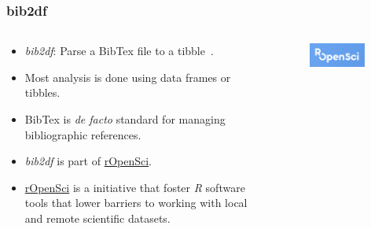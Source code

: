 \documentclass[aspectratio=169]{beamer}
\begin{document}
\begin{frame}
    \frametitle{bib2df}
    \begin{columns}
        \begin{column}{0.5\textwidth}
            \begin{itemize}
                \item \textit{bib2df}: Parse a BibTex file to a 
                    tibble~\cite{ottolinger2024}.
                \item Most  analysis is done using data frames or 
                    tibbles.
                \item BibTex is \textit{de facto} standard for managing 
                    bibliographic references.
                \item \textit{bib2df} is part of 
                    \href{https://ropensci.org/}{rOpenSci}.
                \item \href{https://ropensci.org/}{rOpenSci} is a initiative 
                    that foster \textit{R} software tools that lower barriers 
                    to working with local and remote scientific datasets.
            \end{itemize}
        \end{column}
        \begin{column}{0.5\textwidth}
            \begin{figure}
                \centering
                \includegraphics[width=0.9\textwidth]{logos/ropensci.png}
            \end{figure}
        \end{column}
    \end{columns}
\end{frame}
\end{document}
